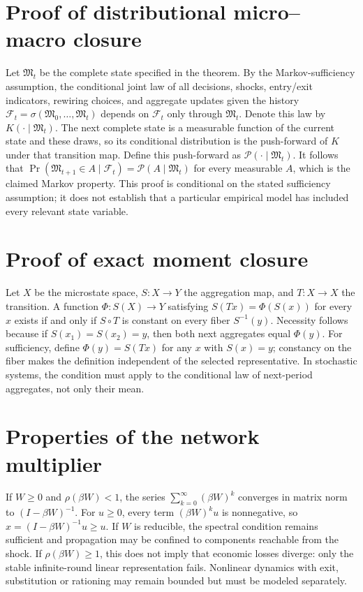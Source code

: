 \documentclass[11pt,a4paper]{article}
\begin{document}
\section{Proof of distributional micro--macro closure}
Let $\mathfrak M_t$ be the complete state specified in the theorem. By the Markov-sufficiency assumption, the conditional joint law of all decisions, shocks, entry/exit indicators, rewiring choices, and aggregate updates given the history $\mathcal F_t=\sigma(\mathfrak M_0,\ldots,\mathfrak M_t)$ depends on $\mathcal F_t$ only through $\mathfrak M_t$. Denote this law by $K(\cdot\mid\mathfrak M_t)$. The next complete state is a measurable function of the current state and these draws, so its conditional distribution is the push-forward of $K$ under that transition map. Define this push-forward as $\mathcal P(\cdot\mid\mathfrak M_t)$. It follows that $\Pr(\mathfrak M_{t+1}\in A\mid\mathcal F_t)=\mathcal P(A\mid\mathfrak M_t)$ for every measurable $A$, which is the claimed Markov property. This proof is conditional on the stated sufficiency assumption; it does not establish that a particular empirical model has included every relevant state variable.

\section{Proof of exact moment closure}
Let $X$ be the microstate space, $S:X\to Y$ the aggregation map, and $T:X\to X$ the transition. A function $\Phi:S(X)\to Y$ satisfying $S(Tx)=\Phi(S(x))$ for every $x$ exists if and only if $S\circ T$ is constant on every fiber $S^{-1}(y)$. Necessity follows because if $S(x_1)=S(x_2)=y$, then both next aggregates equal $\Phi(y)$. For sufficiency, define $\Phi(y)=S(Tx)$ for any $x$ with $S(x)=y$; constancy on the fiber makes the definition independent of the selected representative. In stochastic systems, the condition must apply to the conditional law of next-period aggregates, not only their mean.

\section{Properties of the network multiplier}
If $W\geq0$ and $\rho(\beta W)<1$, the series $\sum_{k=0}^{\infty}(\beta W)^k$ converges in matrix norm to $(I-\beta W)^{-1}$. For $u\geq0$, every term $(\beta W)^ku$ is nonnegative, so $x=(I-\beta W)^{-1}u\geq u$. If $W$ is reducible, the spectral condition remains sufficient and propagation may be confined to components reachable from the shock. If $\rho(\beta W)\geq1$, this does not imply that economic losses diverge: only the stable infinite-round linear representation fails. Nonlinear dynamics with exit, substitution or rationing may remain bounded but must be modeled separately.
\end{document}

